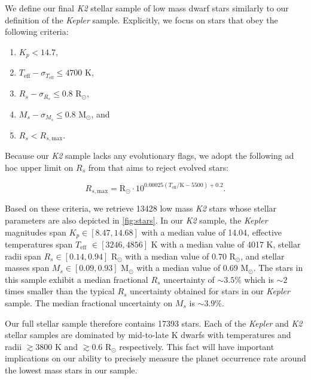 \documentclass[twocolumn]{emulateapj}
\newcommand{\kepler}[1]{\emph{Kepler}#1}
\newcommand{\ktwo}[1]{\emph{K2}#1}
\newcommand{\teff}[1]{$T_{\text{eff}}$#1}
\begin{document}
We define our final \ktwo{} stellar sample of low mass dwarf stars similarly to our definition of the \kepler{} sample.
Explicitly, we focus on stars that obey the following criteria:

\begin{enumerate}
\item $K_p < 14.7$,
\item $T_{\text{eff}} - \sigma_{T_{\text{eff}}} \leq 4700$ K,
\item $R_s - \sigma_{R_s} \leq 0.8$ R$_{\odot}$,
\item $M_s - \sigma_{M_s} \leq 0.8$ M$_{\odot}$, and
\item $R_s < R_{s,\text{max}}$.
\end{enumerate}

\noindent Because our \ktwo{} sample lacks any evolutionary flags, we adopt the following ad hoc upper limit on $R_s$
from \cite{fulton17} that aims to reject evolved stars:

\begin{equation}
  R_{s,\text{max}} = \text{R}_{\odot} \cdot 10^{0.00025(T_{\text{eff}}/\text{K}-5500)+0.2}.
\end{equation}

\noindent Based on these criteria, we retrieve 13428 low mass \ktwo{} stars whose
stellar parameters are also depicted in \autoref{fig:stars}.
In our \ktwo{} sample, the \kepler{} magnitudes span $K_p \in [8.47, 14.68]$ with a median value of 14.04,
effective temperatures span \teff{} $\in [3246, 4856]$ K with a median value of 4017 K,
stellar radii span $R_s \in [0.14, 0.94]$ R$_{\odot}$ with a median value of 0.70 R$_{\odot}$, and
stellar masses span $M_s \in [0.09, 0.93]$ M$_{\odot}$ with a median value of 0.69 M$_{\odot}$.
The stars in this sample exhibit a median fractional $R_s$ uncertainty of $\sim 3.5$\% which is $\sim 2$
times smaller than the typical $R_s$ uncertainty obtained for stars in our \kepler{} sample.
The median fractional uncertainty on $M_s$ is $\sim 3.9$\%.

Our full stellar sample therefore contains 17393 stars.
Each of the \kepler{} and \ktwo{} stellar samples are dominated by mid-to-late K dwarfs
with temperatures and radii $\gtrsim 3800$ K and $\gtrsim 0.6$ R$_{\odot}$ respectively. This
fact will have important implications on our ability to precisely measure the planet occurrence
rate around the lowest mass stars in our sample.
\end{document}
